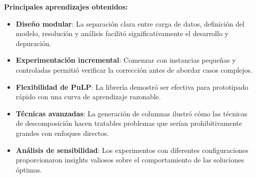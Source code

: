 \documentclass[a4paper,12pt]{article}
\begin{document}
\textbf{Principales aprendizajes obtenidos:}

\begin{itemize}
    \item \textbf{Diseño modular}: La separación clara entre carga de datos, definición del modelo, resolución y análisis facilitó significativamente el desarrollo y depuración.
    
    \item \textbf{Experimentación incremental}: Comenzar con instancias pequeñas y controladas permitió verificar la corrección antes de abordar casos complejos.
    
    \item \textbf{Flexibilidad de PuLP}: La librería demostró ser efectiva para prototipado rápido con una curva de aprendizaje razonable.
    
    \item \textbf{Técnicas avanzadas}: La generación de columnas ilustró cómo las técnicas de descomposición hacen tratables problemas que serían prohibitivamente grandes con enfoques directos.
    
    \item \textbf{Análisis de sensibilidad}: Los experimentos con diferentes configuraciones proporcionaron insights valiosos sobre el comportamiento de las soluciones óptimas.
\end{itemize}
\end{document}
